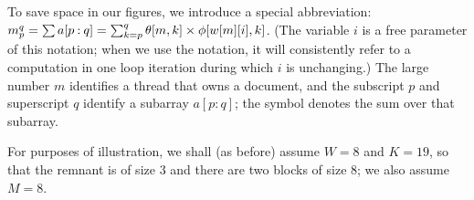 \documentclass[10pt,nohyperref]{sigplanconf}
\begin{document}
\newcommand\ZB[3]{{\unitlength=1 in \divide\unitlength by 16
  \begin{picture}(3.3,3)
  \put(0,0){\hbox{\color[gray]{1}\vrule width 3.3\unitlength height 3\unitlength}}
  \put(1.65,1.5){\vbox to 0pt{\vss\hbox to 0pt{\hss{$\Z{#1}{#2}{#3}$}\hss}\vss}}
  \put(0,0){\line(0,1){3}}
  \put(0,0){\line(1,0){3.3}}
  \put(3.3,0){\line(0,1){3}}
  \put(0,3){\line(1,0){3.3}}
 \end{picture}}}



To save space in our figures, we introduce a special abbreviation: $\Z{m}{p}{q} = \sum a[p\mathbin{:}q] = \sum_{k=p}^{q}  \theta[m,k] \times \phi[w[m][i],k]$.
(The variable $i$ is a free parameter of this notation; when we use the notation, it will consistently refer to
a computation in one loop iteration during which $i$ is unchanging.)  The large number $m$ identifies a thread
that owns a document, and the subscript $p$ and superscript $q$ identify a subarray $a[p\mathbin{:}q]$; the symbol denotes the sum over that subarray.

For purposes of illustration, we shall (as before) assume $W=8$ and $K=19$,
so that the remnant is of size $3$ and there are two blocks of size $8$; we also assume $M=8$.
\end{document}
